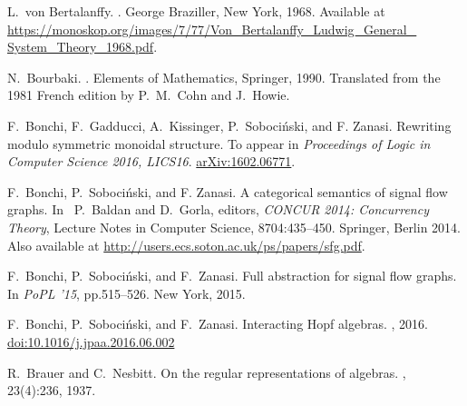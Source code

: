\begin{thebibliography}{RSW00}

    
    L.\ von Bertalanffy. 
    .
    George Braziller, New York, 1968.
    \newblock Available at
    \href{https://monoskop.org/images/7/77/Von_Bertalanffy_Ludwig_General_System_Theory_1968.pdf}{https://monoskop.org/images/7/77/Von\_Bertalanffy\_Ludwig\_General\_ System\_Theory\_1968.pdf}.

    N.\ Bourbaki.
    . Elements of Mathematics,
    Springer, 1990. Translated from the 1981 French edition by P.\ M.\ Cohn and
    J.\ Howie.

    F.\ Bonchi, F.\ Gadducci, A.\ Kissinger, P.\ Soboci\'nski, and F. Zanasi.
    \newblock Rewriting modulo symmetric monoidal structure.
    \newblock To appear in {\sl Proceedings of Logic in Computer Science 2016,
    LICS16}.
    \newblock \href{http://arxiv.org/abs/1602.06771}{arXiv:1602.06771}.

    F.\ Bonchi, P.\ Soboci\'nski, and F. Zanasi.
    \newblock A categorical semantics of signal flow graphs.
    \newblock In \ P.\ Baldan and
    D.\ Gorla, editors, \emph{CONCUR 2014: Concurrency Theory}, Lecture Notes in Computer Science, 8704:435--450.
    \newblock Springer, Berlin 2014.
    \newblock Also available at
    \href{http://users.ecs.soton.ac.uk/ps/papers/sfg.pdf}
    {http://users.ecs.soton.ac.uk/ps/papers/sfg.pdf}.
    
    F.\ Bonchi, P.\ Soboci\'nski, and F.\ Zanasi.
    \newblock Full abstraction for signal flow graphs.
    \newblock In \emph{PoPL '15}, pp.515--526. New York, 2015.

    F.\ Bonchi, P.\ Soboci\'nski, and F.\ Zanasi.
    \newblock Interacting Hopf algebras.
    , 2016.
    \newblock
    \href{http://dx.doi.org/10.1016/j.jpaa.2016.06.002}{doi:10.1016/j.jpaa.2016.06.002}

    R.\ Brauer and C.\ Nesbitt. 
    \newblock On the regular representations of algebras.
    , 23(4):236, 1937.


\end{thebibliography}
